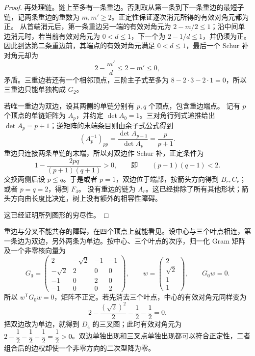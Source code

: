 \begin{proof}
	再处理链。链上至多有一条重边。否则取从第一条到下一条重边的最短子链，记两条重边的重数为 \(m,m'\geq2\)。正定性保证逐次消元所得的有效对角元都为正。 从首端消元后，第一条重边另一端的有效对角元为 \(2-m/2\leq1\)；沿中间单边消元时，若当前有效对角元为 \(0<d\leq1\)，下一个为 \(2-1/d\leq1\)，并仍须为正。 因此到达第二条重边前，其端点的有效对角元满足 \(0<d\leq1\)，最后一个 Schur 补对角元却为
	\[
		2-\frac{m'}d\leq2-m'\leq0,
	\]
	矛盾。三重边若还有一个相邻顶点，三阶主子式至多为 \(8-2\cdot3-2\cdot1=0\)，所以三重边只能单独构成 \(G_2\)。

	若唯一重边为双边，设其两侧的单链分别有 \(p,q\) 个顶点，包含重边端点。 记有 \(p\) 个顶点的单链矩阵为 \(A_p\)，并约定 \(\det A_0=1\)。三对角行列式递推给出 \(\det A_p=p+1\)；逆矩阵的末端条目则由余子式公式得到
	\[
		(A_p^{-1})_{pp}=\frac{\det A_{p-1}}{\det A_p}=\frac p{p+1}.
	\]
	重边只连接两条单链的末端，所以对双边作 Schur 补，正定条件为
	\[
		1-\frac{2pq}{(p+1)(q+1)}>0, \qquad\text{即}\qquad(p-1)(q-1)<2.
	\]
	交换两侧后设 \(p\leq q\)。于是或者 \(p=1\)，双边位于端部，按箭头方向得到 \(B_r,C_r\)；或者 \(p=q=2\)，得到 \(F_4\)。 没有重边的链为 \(A_r\)。这已经排除了所有其他形状；箭头方向由长度比决定，树上没有额外的相容性障碍。

	这已经证明所列图形的穷尽性。
\end{proof}

重边与分叉不能共存的障碍，在四个顶点上就能看见。设中心与三个叶点相连，第一条边为双边，另外两条为单边。按中心、三个叶点的次序，归一化 Gram 矩阵及一个非零核向量为
\[
	G_0=\begin{pmatrix}
		2&-\sqrt2&-1&-1\\
		-\sqrt2&2&0&0\\
		-1&0&2&0\\
		-1&0&0&2
	\end{pmatrix},\qquad
	w=\begin{pmatrix}2\\\sqrt2\\1\\1\end{pmatrix},\qquad
	G_0w=0.
\]
所以 \(w^{\mathsf T}G_0w=0\)，矩阵不正定。若先消去三个叶点，中心的有效对角元同样变为
\[
	2-\frac{(\sqrt2)^2}{2}-\frac12-\frac12=0.
\]
把双边改为单边，就得到 \(D_4\) 的三叉图；此时有效对角元为 \(2-\dfrac12-\dfrac12-\dfrac12=\dfrac12>0\)。双边单独出现和三叉点单独出现都可以符合正定性，二者组合后的边权却使一个非零方向的二次型降为零。

\ProseParagraphBreak

